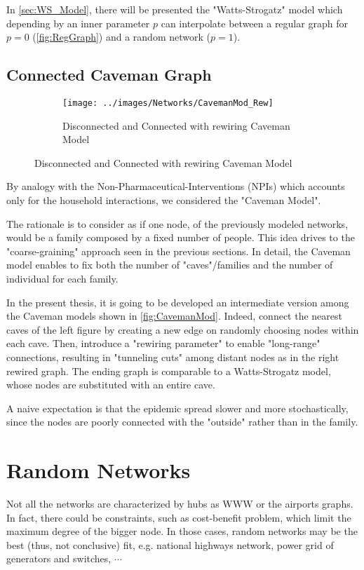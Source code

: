 \documentclass[a4paper,10pt,twoside]{book} %
\theoremstyle{definition}
\begin{document}
In \autoref{sec:WS_Model}, there will be presented the "Watts-Strogatz" model which depending by an inner parameter $p$ can interpolate between a regular graph for $p = 0$ (\autoref{fig:RegGraph}) and a random network ($p=1$).

\subsection{Connected Caveman Graph}
\begin{figure}[ht]
    \begin{subfigure}{\textwidth}
        \texttt{[image: ../images/Networks/CavemanMod\_Rew]}
        \centering
        \caption{Disconnected and Connected with rewiring Caveman Model \cite{Taube:2005_IndianSoftwIndustry}}
        \label{fig:CavemanMod}
    \end{subfigure}
\end{figure}

By analogy with the Non-Pharmaceutical-Interventions (NPIs) which accounts only for the household interactions, we considered the "Caveman Model".

The rationale is to consider as if one node, of the previously modeled networks, would be a family composed by a fixed number of people. This idea drives to the "coarse-graining" approach seen in the previous sections.
In detail, the Caveman model enables to fix both the number of "caves"/families and the number of individual for each family. 

In the present thesis, it is going to be developed an intermediate version among the Caveman models shown in \autoref{fig:CavemanMod}. Indeed, connect the nearest caves of the left figure by creating a new edge on randomly choosing nodes within each cave. Then, introduce a "rewiring parameter" to enable "long-range" connections, resulting in "tunneling cuts" among distant nodes as in the right rewired graph. The ending graph is comparable to a Watts-Strogatz model, whose nodes are substituted with an entire cave.

A naive expectation is that the epidemic spread slower and more stochastically, since the nodes are poorly connected with the "outside" rather than in the family.

\section{Random Networks}
Not all the networks are characterized by hubs as WWW or the airports graphs.
In fact, there could be constraints, such as cost-benefit problem, which limit the maximum degree of the bigger node. In those cases, random networks may be the best (thus, not conclusive) fit, e.g. national highways network, power grid of generators and switches, $\cdots$
\end{document}
